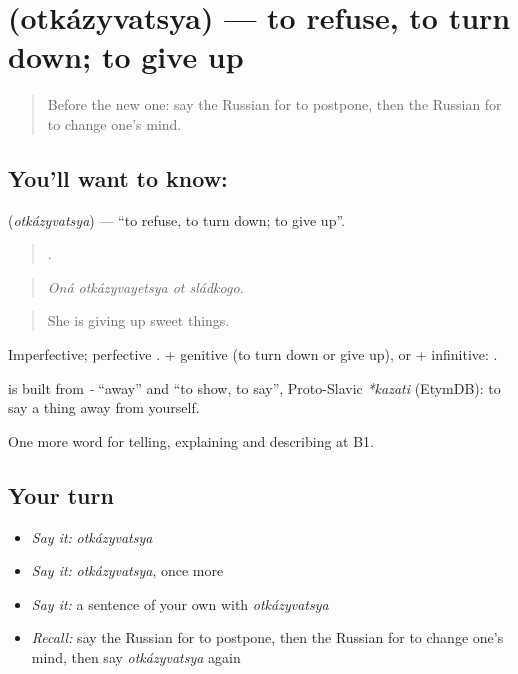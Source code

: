 \section[\texorpdfstring{\ru{отказываться} (otkázyvatsya)}{отказываться (otkázyvatsya)}]{ (otkázyvatsya) — to refuse, to turn down; to give up}

\label{lesson:RU-C377-otkazyvatsya}



\begin{quote}
Before the new one: say the Russian for to postpone, then the Russian for to change one’s mind.
\end{quote}

\subsection*{You'll want to know: }
\textbf{} (\emph{otkázyvatsya}) — \textquotedblleft{}to refuse, to turn down; to give up\textquotedblright{}.

\begin{quote}
   .
\end{quote}

\begin{quote}
\emph{Oná otkázyvayetsya ot sládkogo.}
\end{quote}

\begin{quote}
She is giving up sweet things.
\end{quote}

Imperfective; perfective \emph{}. \emph{ } + genitive (to turn down or give up), or + infinitive: \emph{ }.

\begin{cousinweb}
\textbf{} is built from \emph{-} \textquotedblleft{}away\textquotedblright{} and \emph{} \textquotedblleft{}to show, to say\textquotedblright{}, Proto-Slavic \emph{*kazati} (EtymDB): to say a thing away from yourself.
\end{cousinweb}

\begin{grammarlens}[title={What you've built}]
One more word for telling, explaining and describing at B1.
\end{grammarlens}

\subsection*{Your turn}
\begin{itemize}
\raggedright
  \item \emph{Say it:} \emph{otkázyvatsya}
  \item \emph{Say it:} \emph{otkázyvatsya}, once more
  \item \emph{Say it:} a sentence of your own with \emph{otkázyvatsya}
  \item \emph{Recall:} say the Russian for to postpone, then the Russian for to change one’s mind, then say \emph{otkázyvatsya} again
\end{itemize}

